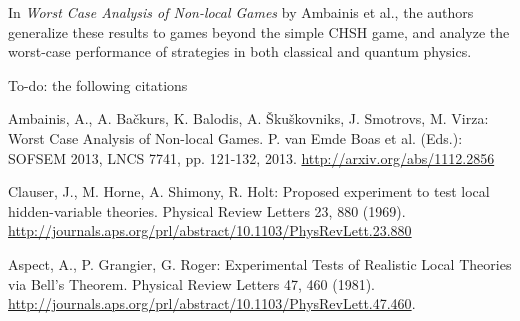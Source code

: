 In \emph{Worst Case Analysis of Non-local Games} by Ambainis et al., the authors generalize these results to games beyond the simple CHSH game, and analyze the worst-case performance of strategies in both classical and quantum physics.



To-do: the following citations

Ambainis, A., A. Ba\v{c}kurs, K. Balodis, A. \v{S}ku\v{s}kovniks, J. Smotrovs, M. Virza: Worst Case Analysis of Non-local Games. P. van Emde Boas et al. (Eds.): SOFSEM 2013, LNCS 7741, pp. 121-132, 2013. \url{http://arxiv.org/abs/1112.2856}

Clauser, J., M. Horne, A. Shimony, R. Holt: Proposed experiment to test local
hidden-variable theories. Physical Review Letters 23, 880 (1969). \url{http://journals.aps.org/prl/abstract/10.1103/PhysRevLett.23.880}

Aspect, A., P. Grangier, G. Roger: Experimental Tests of Realistic Local Theories via Bell's Theorem. Physical Review Letters 47, 460 (1981). \url{http://journals.aps.org/prl/abstract/10.1103/PhysRevLett.47.460}.

